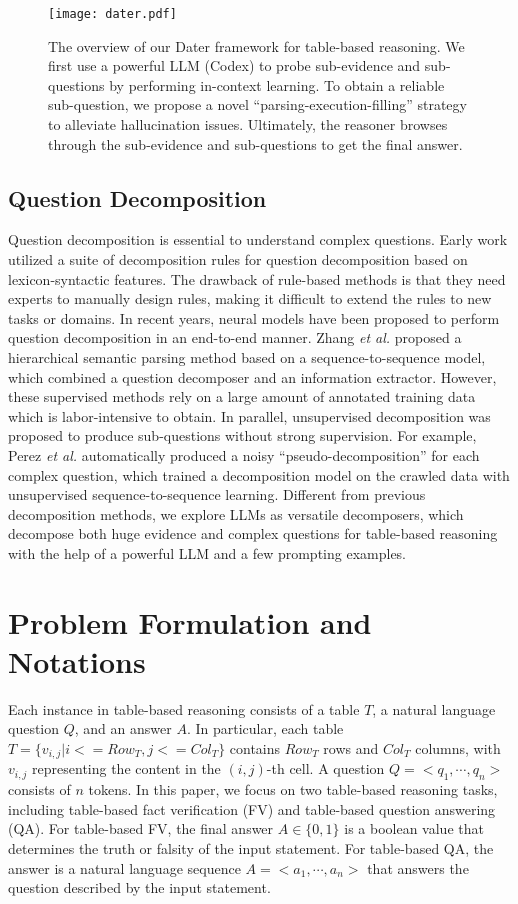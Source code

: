 \begin{figure*}
    \centering
    \setlength{\abovecaptionskip}{5pt} 
    \texttt{[image: dater.pdf]}
    \caption{The overview of our Dater framework for table-based reasoning. We first use a powerful LLM (Codex) to probe sub-evidence and sub-questions by performing in-context learning. To obtain a reliable sub-question, we propose a novel ``parsing-execution-filling'' strategy to alleviate hallucination issues. Ultimately, the reasoner browses through the sub-evidence and sub-questions to get the final answer.
    }
    \label{pipeline}
\end{figure*}

\subsection{Question Decomposition}
Question decomposition is essential to understand complex questions. Early work \citep{kalyanpur2012fact} utilized a suite of decomposition rules for question decomposition based on lexicon-syntactic features. The drawback of rule-based methods is that they need experts to manually design rules, making it difficult to extend the rules to new tasks or domains. In recent years, neural models \citep{talmor2018web,zhang2019complex} have been proposed to perform question decomposition in an end-to-end manner.
Zhang \textit{et al.} \citep{zhang2019complex} proposed a hierarchical semantic parsing method based on a sequence-to-sequence model, which combined a question decomposer and an information extractor. 
However, these supervised methods rely on a large amount of annotated training data which is labor-intensive to obtain. In parallel, unsupervised decomposition was proposed to produce sub-questions without strong supervision. For example, Perez \textit{et al.} \citep{perez2020unsupervised} automatically produced a noisy ``pseudo-decomposition'' for
each complex question, which trained a
decomposition model on the crawled data with unsupervised sequence-to-sequence learning. 
Different from previous decomposition methods, we explore LLMs as versatile decomposers, which decompose both huge evidence and complex questions for table-based reasoning with the help of a powerful LLM and a few prompting examples. 

\section{Problem Formulation and Notations}
Each instance in table-based reasoning consists of a table $T$, a natural language question $Q$, and an answer $A$. In particular, each table $T=\{v_{i,j}|i<= {Row}_T,j<={Col}_T\}$ contains ${Row}_T$ rows and ${Col}_T$ columns, with $v_{i,j}$ representing the content in the $(i, j)$-th cell. A question $Q = <q_1,{\cdots} ,q_n >$ consists of $n$ tokens. In this paper, we focus on two table-based reasoning tasks, including table-based fact verification (FV) and table-based question answering (QA). For table-based FV, the final answer $A \in \{0, 1\}$ is a boolean value that determines the truth or falsity of the input statement. For table-based QA, the answer is a natural language sequence $A = <a_1,{\cdots}, a_n> $ that answers the question described by the input statement.

